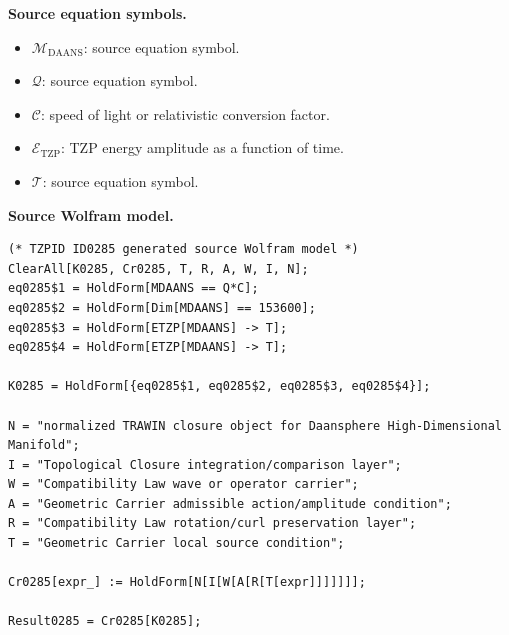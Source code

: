 \begin{minipage}[t]{0.49\linewidth}
\begingroup
\small
\raggedright
\textbf{Source equation symbols.}\par
\begin{itemize}[leftmargin=1.35em,itemsep=1pt,topsep=1pt,parsep=0pt]
    \item $\mathcal{M}_{\mathrm{DAANS}}$: source equation symbol.
    \item $\mathcal{Q}$: source equation symbol.
    \item $\mathcal{C}$: speed of light or relativistic conversion factor.
    \item $\mathcal{E}_{\mathrm{TZP}}$: TZP energy amplitude as a function of time.
    \item $\mathcal{T}$: source equation symbol.
\end{itemize}
\endgroup
\end{minipage}\hfill
\begin{minipage}[t]{0.47\linewidth}
\begingroup
\scriptsize
\raggedright
\textbf{Source Wolfram model.}\par
\begin{Verbatim}[fontsize=\tiny,breaklines=true,breakanywhere=true]
(* TZPID ID0285 generated source Wolfram model *)
ClearAll[K0285, Cr0285, T, R, A, W, I, N];
eq0285$1 = HoldForm[MDAANS == Q*C];
eq0285$2 = HoldForm[Dim[MDAANS] == 153600];
eq0285$3 = HoldForm[ETZP[MDAANS] -> T];
eq0285$4 = HoldForm[ETZP[MDAANS] -> T];

K0285 = HoldForm[{eq0285$1, eq0285$2, eq0285$3, eq0285$4}];

N = "normalized TRAWIN closure object for Daansphere High-Dimensional Manifold";
I = "Topological Closure integration/comparison layer";
W = "Compatibility Law wave or operator carrier";
A = "Geometric Carrier admissible action/amplitude condition";
R = "Compatibility Law rotation/curl preservation layer";
T = "Geometric Carrier local source condition";

Cr0285[expr_] := HoldForm[N[I[W[A[R[T[expr]]]]]]];

Result0285 = Cr0285[K0285];
\end{Verbatim}
\endgroup
\end{minipage}

